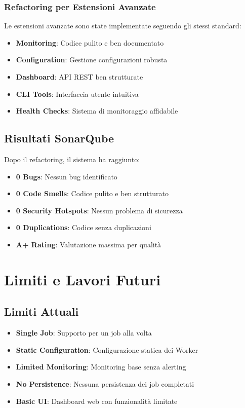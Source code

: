 \documentclass[12pt,a4paper]{article}
\begin{document}
\subsubsection{Refactoring per Estensioni Avanzate}

Le estensioni avanzate sono state implementate seguendo gli stessi standard:

\begin{itemize}
\item \textbf{Monitoring}: Codice pulito e ben documentato
\item \textbf{Configuration}: Gestione configurazioni robusta
\item \textbf{Dashboard}: API REST ben strutturate
\item \textbf{CLI Tools}: Interfaccia utente intuitiva
\item \textbf{Health Checks}: Sistema di monitoraggio affidabile
\end{itemize}

\subsection{Risultati SonarQube}

Dopo il refactoring, il sistema ha raggiunto:

\begin{itemize}
\item \textbf{0 Bugs}: Nessun bug identificato
\item \textbf{0 Code Smells}: Codice pulito e ben strutturato
\item \textbf{0 Security Hotspots}: Nessun problema di sicurezza
\item \textbf{0 Duplications}: Codice senza duplicazioni
\item \textbf{A+ Rating}: Valutazione massima per qualità
\end{itemize}

\section{Limiti e Lavori Futuri}

\subsection{Limiti Attuali}

\begin{itemize}
\item \textbf{Single Job}: Supporto per un job alla volta
\item \textbf{Static Configuration}: Configurazione statica dei Worker
\item \textbf{Limited Monitoring}: Monitoring base senza alerting
\item \textbf{No Persistence}: Nessuna persistenza dei job completati
\item \textbf{Basic UI}: Dashboard web con funzionalità limitate
\end{itemize}
\end{document}

